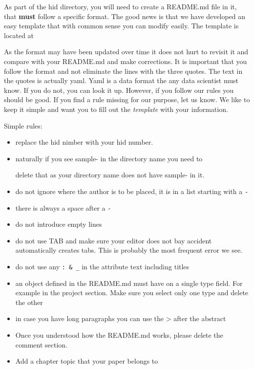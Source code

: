 As part of the hid directory, you will need to create a README.md file
in it, that \textbf{must} follow a specific format. The good news is
that we have developed an easy template that with common sense you can
modify easily. The template is located at


As the format may have been updated over time it does not hurt to
revisit it and compare with your README.md and make corrections. It is
important that you follow the format and not eliminate the lines with
the three quotes. The text in the quotes is actually yaml. Yaml is a
data format the any data scientist must know. If you do not, you can
look it up. However, if you follow our rules you should be good. If you
find a rule missing for our purpose, let us know. We like to keep it
simple and want you to fill out the \emph{template} with your
information.

Simple rules:

\begin{itemize}

\item
  replace the hid nimber with your hid number.
\item naturally if you see sample- in the directory name you need to

  delete that as your directory name does not have sample- in it.
\item do not ignore where the author is to be placed, it is in a list
  starting with a \verb|-|

\item there is always a space after a \verb|-|

\item do not introduce empty lines

\item do not use TAB and make sure your editor does not bay accident
  automatically creates tabs. This is probably the most frequent error
  we see.

\item do not use any \verb|: & _| in the attribute text including titles

\item an object defined in the README.md must have on a single type
  field.  For example in the project section. Make sure you select
  only one type and delete the other

\item in case you have long paragraphs you can use the \textgreater{}
  after the abstract

\item Once you understood how the README.md works, please delete the
  comment section.
\item Add a chapter topic that your paper belongs to

\end{itemize}

